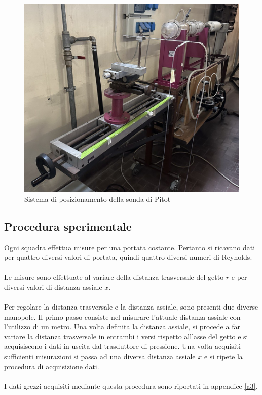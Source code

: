 \begin{figure}[ht]
    \centering
    \includegraphics[width=.85\textwidth]{images/3/gettomanopole.jpg}
    \caption{Sistema di posizionamento della sonda di Pitot}
\end{figure}

\subsection{Procedura sperimentale}
Ogni squadra effettua misure per una portata costante. Pertanto si ricavano dati per quattro diversi valori di portata, quindi quattro diversi numeri di Reynolds.\\\\
Le misure sono effettuate al variare della distanza trasversale del getto $r$ e per diversi valori di distanza assiale $x$.\\\\
Per regolare la distanza trasversale e la distanza assiale, sono presenti due diverse manopole. Il primo passo consiste nel misurare l'attuale distanza assiale con l'utilizzo di un metro. Una volta definita la distanza assiale, si procede a far variare la distanza trasversale in entrambi i versi rispetto all'asse del getto e si acquisiscono i dati in uscita dal trasduttore di pressione. Una volta acquisiti sufficienti misurazioni si passa ad una diversa distanza assiale $x$ e si ripete la procedura di acquisizione dati.\\\\
I dati grezzi acquisiti mediante questa procedura sono riportati in appendice \ref{a3}.


